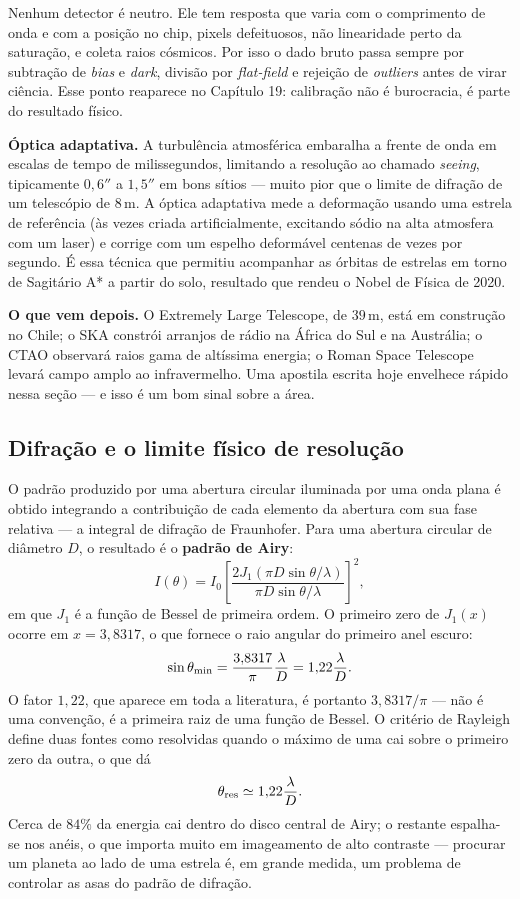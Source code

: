 \documentclass[11pt,a4paper]{article}
\begin{document}
Nenhum detector é neutro. Ele tem resposta que varia com o comprimento de onda e com a posição no chip, pixels defeituosos, não linearidade perto da saturação, e coleta raios cósmicos. Por isso o dado bruto passa sempre por subtração de \textit{bias} e \textit{dark}, divisão por \textit{flat-field} e rejeição de \textit{outliers} antes de virar ciência. Esse ponto reaparece no Capítulo 19: calibração não é burocracia, é parte do resultado físico.

\textbf{Óptica adaptativa.} A turbulência atmosférica embaralha a frente de onda em escalas de tempo de milissegundos, limitando a resolução ao chamado \textit{seeing}, tipicamente $0{,}6''$ a $1{,}5''$ em bons sítios --- muito pior que o limite de difração de um telescópio de $8\,\mathrm{m}$. A óptica adaptativa mede a deformação usando uma estrela de referência (às vezes criada artificialmente, excitando sódio na alta atmosfera com um laser) e corrige com um espelho deformável centenas de vezes por segundo. É essa técnica que permitiu acompanhar as órbitas de estrelas em torno de Sagitário A* a partir do solo, resultado que rendeu o Nobel de Física de 2020.

\textbf{O que vem depois.} O Extremely Large Telescope, de $39\,\mathrm{m}$, está em construção no Chile; o SKA constrói arranjos de rádio na África do Sul e na Austrália; o CTAO observará raios gama de altíssima energia; o Roman Space Telescope levará campo amplo ao infravermelho. Uma apostila escrita hoje envelhece rápido nessa seção --- e isso é um bom sinal sobre a área.

\subsection*{Difração e o limite físico de resolução}

O padrão produzido por uma abertura circular iluminada por uma onda plana é obtido integrando a contribuição de cada elemento da abertura com sua fase relativa --- a integral de difração de Fraunhofer. Para uma abertura circular de diâmetro $D$, o resultado é o \textbf{padrão de Airy}:
\[
I(\theta)=I_0\left[\frac{2J_1(\pi D\sin\theta/\lambda)}{\pi D\sin\theta/\lambda}\right]^{2},
\]
em que $J_1$ é a função de Bessel de primeira ordem. O primeiro zero de $J_1(x)$ ocorre em $x=3{,}8317$, o que fornece o raio angular do primeiro anel escuro:
\[
\sin\theta_{\rm min}=\frac{3{,}8317}{\pi}\frac{\lambda}{D}=1{,}22\frac{\lambda}{D}.
\]
O fator $1{,}22$, que aparece em toda a literatura, é portanto $3{,}8317/\pi$ --- não é uma convenção, é a primeira raiz de uma função de Bessel. O critério de Rayleigh define duas fontes como resolvidas quando o máximo de uma cai sobre o primeiro zero da outra, o que dá
\[
\theta_{\rm res}\simeq1{,}22\frac{\lambda}{D}.
\]
Cerca de $84\%$ da energia cai dentro do disco central de Airy; o restante espalha-se nos anéis, o que importa muito em imageamento de alto contraste --- procurar um planeta ao lado de uma estrela é, em grande medida, um problema de controlar as asas do padrão de difração.
\end{document}
